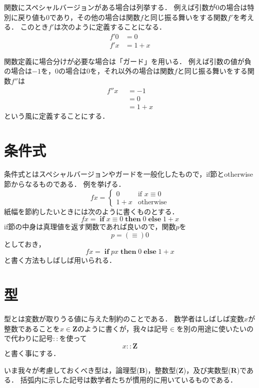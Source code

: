 \documentclass[twocolumn]{jsbook}
\newcommand{\guard}[1]{\mathop{\mid_{{#1}}}}
\newcommand{\typename}[1]{\bm{#1}}
\newcommand{\booleantype}{\typename{B}}
\newcommand{\integertype}{\typename{Z}}
\newcommand{\realtype}{\typename{R}}
\newcommand{\haskellkeyword}[1]{\textbf{#1}}
\newcommand{\otherwise}{\haskellkeyword{otherwise}}
\newcommand{\mathkeyword}[1]{\textbf{#1}}
\newcommand{\mathelse}{\mathop{\mathkeyword{else}}}
\newcommand{\mathif}{\mathop{\mathkeyword{if}}}
\newcommand{\maththen}{\mathop{\mathkeyword{then}}}
\begin{document}
関数にスペシャルバージョンがある場合は列挙する．
例えば引数が$0$の場合は特別に戻り値も0であり，その他の場合は関数$f$と同じ振る舞いをする関数$f'$を考える．
このとき$f'$は次のように定義することになる．
\begin{equation*}
\begin{split}
f'0&=0\\
f'x&=1+x
\end{split}
\end{equation*}

関数定義に場合分けが必要な場合は「ガード」を用いる．
例えば引数の値が負の場合は$-1$を，$0$の場合は$0$を，それ以外の場合は関数$f$と同じ振る舞いをする関数$f''$は
\begin{equation*}
\begin{split}
f''x&\guard{x<0}=-1\\
&\guard{x\equiv0}=0\\
&\guard{\otherwise}=1+x
\end{split}
\end{equation*}
という風に定義することにする．

\section{条件式}

条件式とはスペシャルバージョンやガードを一般化したもので，if節とotherwise節からなるものである．
例を挙げる．
$$fx=\begin{cases}
0&\text{if $x\equiv0$}\\
1+x&\text{otherwise}
\end{cases}$$
紙幅を節約したいときには次のように書くものとする．
$$fx=\mathif x\equiv0\maththen0\mathelse 1+x$$
if節の中身は真理値を返す関数であれば良いので，関数$p$を$$p=(\equiv)0$$としておき，$$fx=\mathif px\maththen0\mathelse 1+x$$と書く方法もしばしば用いられる．

\section{型}

型とは変数が取りうる値に与えた制約のことである．
数学者はしばしば変数$x$が整数であることを$x\in\integertype$のように書くが，我々は記号$\in$を別の用途に使いたいので代わりに記号$::$を使って$$x::\integertype$$と書く事にする．

いま我々が考慮しておくべき型は，論理型($\booleantype$)，整数型($\integertype$)，及び実数型($\realtype$)である．
括弧内に示した記号は数学者たちが慣用的に用いているものである．
\end{document}
